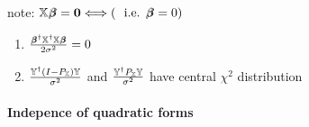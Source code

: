 \documentclass{article}
\begin{document}
\bigskip

note: $\mathbb{X}%
\beta\mkern-9.6mu \beta%
=\boldsymbol{0}\Longleftrightarrow \left( \text{i.e. }%
\beta\mkern-9.6mu \beta%
=0\right) $

\begin{enumerate}
\item $\frac{%
\beta\mkern-9.6mu \beta%
^{\dagger }\mathbb{X}^{\dagger }\mathbb{X}%
\beta\mkern-9.6mu \beta%
}{2\sigma ^{2}}=0$

\item $\frac{\mathbb{Y}^{\dagger }\left( I-P_{\mathbb{X}}\right) \mathbb{Y}}{%
\sigma ^{2}}$ and $\frac{\mathbb{Y}^{\dagger }P_{\mathbb{X}}\mathbb{Y}}{%
\sigma ^{2}}$ have central $\chi ^{2}$ distribution
\end{enumerate}

\bigskip

\paragraph{Indepence of quadratic forms}
\end{document}
